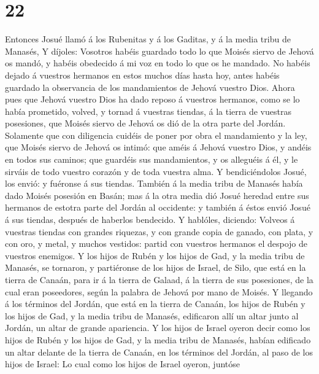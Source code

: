 \hypertarget{section-21}{%
\section{22}\label{section-21}}

 Entonces Josué llamó á los Rubenitas y á los Gaditas, y á
la media tribu de Manasés,  Y díjoles: Vosotros habéis
guardado todo lo que Moisés siervo de Jehová os mandó, y habéis
obedecido á mi voz en todo lo que os he mandado.  No habéis
dejado á vuestros hermanos en estos muchos días hasta hoy, antes habéis
guardado la observancia de los mandamientos de Jehová vuestro Dios.
 Ahora pues que Jehová vuestro Dios ha dado reposo á
vuestros hermanos, como se lo había prometido, volved, y tornad á
vuestras tiendas, á la tierra de vuestras posesiones, que Moisés siervo
de Jehová os dió de la otra parte del Jordán.  Solamente que
con diligencia cuidéis de poner por obra el mandamiento y la ley, que
Moisés siervo de Jehová os intimó: que améis á Jehová vuestro Dios, y
andéis en todos sus caminos; que guardéis sus mandamientos, y os
alleguéis á él, y le sirváis de todo vuestro corazón y de toda vuestra
alma.  Y bendiciéndolos Josué, los envió: y fuéronse á sus
tiendas.  También á la media tribu de Manasés había dado
Moisés posesión en Basán; mas á la otra media dió Josué heredad entre
sus hermanos de estotra parte del Jordán al occidente: y también á éstos
envió Josué á sus tiendas, después de haberlos bendecido.  Y
hablóles, diciendo: Volveos á vuestras tiendas con grandes riquezas, y
con grande copia de ganado, con plata, y con oro, y metal, y muchos
vestidos: partid con vuestros hermanos el despojo de vuestros enemigos.
 Y los hijos de Rubén y los hijos de Gad, y la media tribu
de Manasés, se tornaron, y partiéronse de los hijos de Israel, de Silo,
que está en la tierra de Canaán, para ir á la tierra de Galaad, á la
tierra de sus posesiones, de la cual eran poseedores, según la palabra
de Jehová por mano de Moisés.  Y llegando á los términos
del Jordán, que está en la tierra de Canaán, los hijos de Rubén y los
hijos de Gad, y la media tribu de Manasés, edificaron allí un altar
junto al Jordán, un altar de grande apariencia.  Y los
hijos de Israel oyeron decir como los hijos de Rubén y los hijos de Gad,
y la media tribu de Manasés, habían edificado un altar delante de la
tierra de Canaán, en los términos del Jordán, al paso de los hijos de
Israel:  Lo cual como los hijos de Israel oyeron, juntóse
